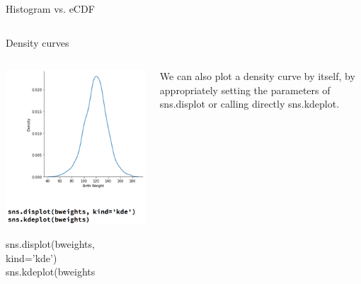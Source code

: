 \documentclass[aspectratio=169]{../latex_main/tntbeamer}  %
\begin{document}
\begin{frame}[c]{Histogram vs. eCDF}
\begin{columns}
\begin{column}{.5\textwidth}
            \end{column}
        \end{columns}
    \end{frame}
    
    
    \begin{frame}{Density curves}
        \begin{columns}
            \begin{column}{.4\textwidth}
            
                      \centering
                      \includegraphics[scale=.3]{Bild33}

                sns.displot(bweights, kind='kde')\\
                sns.kdeplot(bweights

            \end{column}
            
            
            \begin{column}{.6\textwidth}

                  We can also plot a density curve by itself, by appropriately setting the parameters of sns.displot or calling directly sns.kdeplot.\\

            \end{column}
        \end{columns}
    \end{frame}
\end{document}
